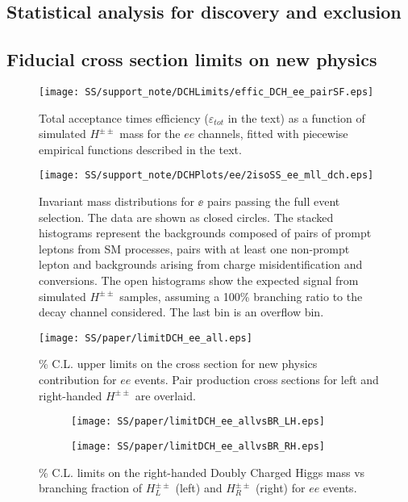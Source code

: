 \subsection{Statistical analysis for discovery and exclusion}
\subsection{Fiducial cross section limits on new physics}

\begin{figure}[h]
\begin{center}
\texttt{[image: SS/support\_note/DCHLimits/effic\_DCH\_ee\_pairSF.eps]}
\caption{\toDo Total acceptance times efficiency ($\varepsilon_{tot}$ in the text) as a function of simulated $H^{\pm\pm}$ mass for the $ee$ channels, 
fitted with piecewise empirical functions described in the text.}
\label{fig:signal_mass}
\end{center}
\end{figure}


\begin{figure}[h]
\begin{center}
\texttt{[image: SS/support\_note/DCHPlots/ee/2isoSS\_ee\_mll\_dch.eps]}
\caption{\toDo Invariant mass distributions for $\ee$ pairs passing the full event selection. 
The data are shown as closed circles. The stacked histograms represent 
the backgrounds composed of pairs of prompt leptons from SM processes, 
pairs with at least one non-prompt lepton and backgrounds arising from charge misidentification and conversions. 
The open histograms show the expected signal from simulated $H^{\pm\pm}$ samples,
assuming a 100\% branching ratio to the decay channel considered. The last bin is an overflow bin.}
\label{fig:signal_mass}
\end{center}
\end{figure}


\begin{figure}[h]
\begin{center}
\texttt{[image: SS/paper/limitDCH\_ee\_all.eps]}
\caption{\% C.L. upper limits on the cross section for new physics contribution for $ee$ events.  
Pair production cross sections for left and right-handed $H^{\pm\pm}$ are overlaid.}
\label{fig:signal_mass}
\end{center}
\end{figure}


\begin{figure}
\begin{subfigure}{.5\textwidth}
  \centering
  \texttt{[image: SS/paper/limitDCH\_ee\_allvsBR\_LH.eps]}
\end{subfigure}%
\begin{subfigure}{.5\textwidth}
  \centering
  \texttt{[image: SS/paper/limitDCH\_ee\_allvsBR\_RH.eps]}
\end{subfigure}
\caption{\% C.L. limits on the right-handed Doubly Charged Higgs mass vs 
branching fraction of $H^{\pm\pm}_L$ (left) and $H^{\pm\pm}_R$ (right) for $ee$ events.}
  \label{fig:signal_kinematics}
\end{figure}




